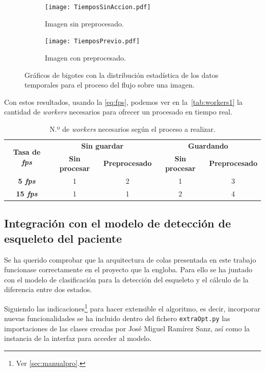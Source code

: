 \begin{figure}[h]
	\begin{subfigure}[b]{\textwidth}
		\texttt{[image: TiemposSinAccion.pdf]}
		\caption{Imagen sin preprocesado.}
	\end{subfigure}
	\begin{subfigure}[b]{\textwidth}
		\texttt{[image: TiemposPrevio.pdf]}
		\caption{Imagen con preprocesado.}
	\end{subfigure}
	\caption{Gráficos de bigotes con la distribución estadística de los datos temporales para el proceso del flujo sobre una imagen.}
	\label{fig:dist2}
\end{figure}

Con estos resultados, usando la \autoref{eq:fps}, podemos ver en la~\autoref{tab:workers1} la cantidad de \textit{workers} necesarios para ofrecer un procesado en tiempo real.

\begin{table}[h]
	\begin{center}
		\begin{tabular}{c  c c c c  }
			\toprule
			\multirow{2}{1.5cm}{\textbf{Tasa de \textit{fps}}}& \multicolumn{2}{c}{\textbf{Sin guardar}} & \multicolumn{2}{c}{\textbf{Guardando}}\\
			& \textbf{Sin procesar} & \textbf{Preprocesado} & \textbf{Sin procesar} & \textbf{Preprocesado}\\
			\otoprule
			\textbf{5 \textit{fps}} & 1 & 2 &1 & 3\\
			\textbf{15 \textit{fps}} & 1 & 1 &2 & 4\\
			\bottomrule
		\end{tabular}
	\end{center}
	\caption{N.º de \textit{workers} necesarios según el proceso a realizar.}
	\label{tab:workers1}
\end{table}


\subsection{Integración con el modelo de detección de esqueleto del paciente}

Se ha querido comprobar que la arquitectura de colas presentada en este trabajo funcionase correctamente en el proyecto que la engloba. Para ello se ha juntado con el modelo de clasificación para la detección del esqueleto y el cálculo de la diferencia entre dos estados.

Siguiendo las indicaciones\footnote{Ver \autoref{sec:manualpro}.} para hacer extensible el algoritmo, es decir, incorporar nuevas funcionalidades se ha incluido dentro del fichero \texttt{extraOpt.py} las importaciones de las clases creadas por José Miguel Ramírez Sanz, así como la instancia de la interfaz para acceder al modelo.

